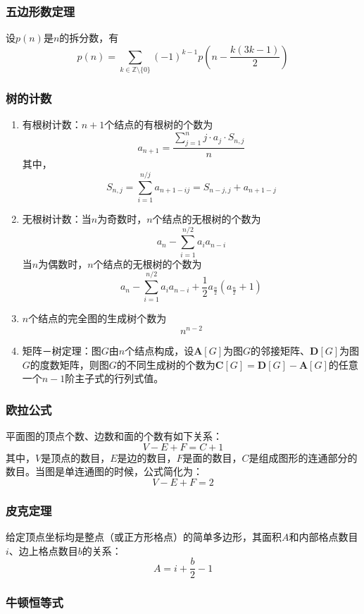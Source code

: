\documentclass[a4paper]{article}
\begin{document}
\subsubsection{五边形数定理}

设$p(n)$是$n$的拆分数，有$$p(n) = \sum_{k \in \mathbb{Z} \setminus \{0\}} (-1)^{k - 1} p\left(n - \frac{k(3k - 1)}{2}\right)$$

\subsubsection{树的计数}

\begin{enumerate}
	\item 有根树计数：$n+1$个结点的有根树的个数为
	$$a_{n+1} = \frac{\sum_{j=1}^{n}{j \cdot a_j \cdot{S_{n, j}}}}{n}$$
	其中，
	$$S_{n, j} = \sum_{i=1}^{n/j}{a_{n+1-ij}} = S_{n-j, j} + a_{n+1-j}$$
	\item 无根树计数：当$n$为奇数时，$n$个结点的无根树的个数为
	$$a_n-\sum_{i=1}^{n/2}{a_ia_{n-i}}$$
	当$n$为偶数时，$n$个结点的无根树的个数为
	$$a_n-\sum_{i=1}^{n/2}{a_ia_{n-i}}+\frac{1}{2}a_{\frac{n}{2}}(a_{\frac{n}{2}}+1)$$
	\item $n$个结点的完全图的生成树个数为
	$$n^{n-2}$$
	\item 矩阵－树定理：图$G$由$n$个结点构成，设$\bm{A}[G]$为图$G$的邻接矩阵、$\bm{D}[G]$为图$G$的度数矩阵，则图$G$的不同生成树的个数为$\bm{C}[G] = \bm{D}[G] - \bm{A}[G]$的任意一个$n-1$阶主子式的行列式值。
\end{enumerate}

\subsubsection{欧拉公式}

平面图的顶点个数、边数和面的个数有如下关系：
$$V - E + F = C+ 1$$
\indent 其中，$V$是顶点的数目，$E$是边的数目，$F$是面的数目，$C$是组成图形的连通部分的数目。当图是单连通图的时候，公式简化为：
$$V - E + F = 2$$

\subsubsection{皮克定理}

给定顶点坐标均是整点（或正方形格点）的简单多边形，其面积$A$和内部格点数目$i$、边上格点数目$b$的关系：
$$A = i + \frac{b}{2} - 1$$

\subsubsection{牛顿恒等式}
\end{document}
